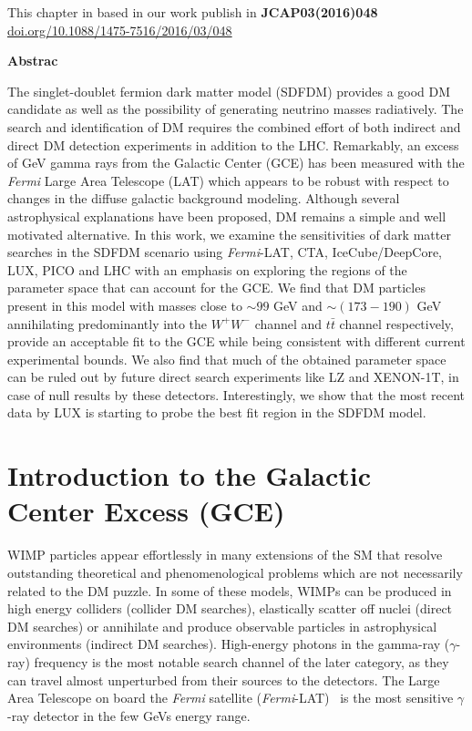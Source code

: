 \begin{flushright}
This chapter in based in our work publish in \textbf{JCAP03(2016)048}\\ 
\url{doi.org/10.1088/1475-7516/2016/03/048}
\end{flushright}
\begin{center}
\textbf{Abstrac}
\end{center}
The singlet-doublet fermion dark matter model (SDFDM) provides a good DM candidate as well as the possibility of generating neutrino masses radiatively.
 The search and identification of DM requires the combined effort of both indirect and direct DM detection experiments in addition to the LHC.
 Remarkably, an excess of GeV gamma rays from the Galactic Center (GCE) has been measured with the \textit{Fermi}  Large Area Telescope (LAT) which appears to be robust with respect to changes in the diffuse galactic background modeling.
 Although several astrophysical explanations have been proposed, DM remains a simple and well motivated alternative.
 In this work, we examine the sensitivities of dark matter searches in the SDFDM scenario using \textit{Fermi}-LAT, CTA, IceCube/DeepCore, LUX, PICO and LHC with an emphasis on exploring the regions of the parameter space that can account for the GCE.
 We find that DM particles present in this model with masses close to $\sim 99$ GeV and $\sim (173-190)$ GeV annihilating predominantly into the $W^+W^-$ channel and $t\bar{t}$ channel respectively, provide an acceptable fit to the GCE while being consistent with different current experimental bounds. We also find that much of the obtained parameter space can be ruled out by future direct search experiments like LZ and XENON-1T, in case of null results by these detectors. Interestingly, we show that the most recent data by LUX is starting to probe the best fit region in the SDFDM model.

\section{Introduction to the Galactic Center Excess (GCE)}
%
WIMP particles appear effortlessly in many extensions of the SM that resolve outstanding theoretical and phenomenological problems which are not necessarily related to the DM puzzle.
 In some of these models, WIMPs can be produced in high energy colliders (collider DM searches), elastically scatter off nuclei (direct DM searches) or annihilate and produce observable particles in astrophysical environments (indirect DM searches).
 High-energy photons in the gamma-ray ($\gamma$-ray) frequency is the most notable search channel of the later category, as they can travel almost unperturbed from their sources to the detectors.
 The Large Area Telescope on board the \textit{Fermi} satellite (\textit{Fermi}-LAT)~\cite{Fermi} is the most sensitive $\gamma$-ray detector in the few GeVs energy range.


